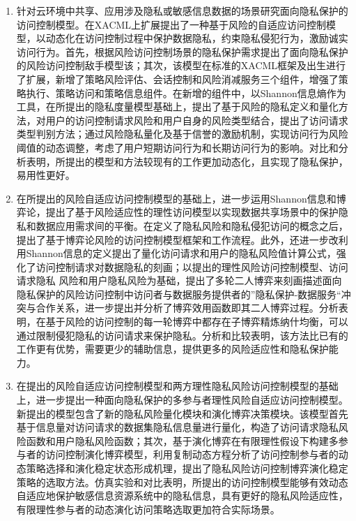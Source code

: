 \begin{enumerate}
	\item 针对云环境中共享、应用涉及隐私或敏感信息数据的场景研究面向隐私保护的访问控制模型。在XACML上扩展提出了一种基于风险的自适应访问控制模型，以动态化在访问控制过程中保护数据隐私，约束隐私侵犯行为，激励诚实访问行为。首先，根据风险访问控制场景的隐私保护需求提出了面向隐私保护的风险访问控制敌手模型该；其次，该模型在标准的XACML框架及出生进行了扩展，新增了策略风险评估、会话控制和风险消减服务三个组件，增强了策略执行、策略访问和策略信息组件。在新增的组件中，以Shannon信息熵作为工具，在所提出的隐私度量模型基础上，提出了基于风险的隐私定义和量化方法，对用户的访问控制请求风险和用户自身的风险类型结合，提出了访问请求类型判别方法；通过风险隐私量化及基于信誉的激励机制，实现访问行为风险阈值的动态调整，考虑了用户短期访问行为和长期访问行为的影响。对比和分析表明，所提出的模型和方法较现有的工作更加动态化，且实现了隐私保护，易用性更好。
	
	\item 在所提出的风险自适应访问控制模型的基础上，进一步运用Shannon信息和博弈论，提出了基于风险适应性的理性访问模型以实现数据共享场景中的保护隐私和数据应用需求间的平衡。在定义了隐私风险和隐私侵犯访问的概念之后，提出了基于博弈论风险的访问控制模型框架和工作流程。此外，还进一步改利用Shannon信息的定义提出了量化访问请求和用户的隐私风险值计算公式，强化了访问控制请求对数据隐私的刻画；以提出的理性风险访问控制模型、访问请求隐私 风险和用户隐私风险为基础，提出了多轮二人博弈来刻画描述面向隐私保护的风险访问控制中访问者与数据服务提供者的”隐私保护-数据服务“冲突与合作关系，进一步提出并分析了博弈效用函数即其二人博弈过程。分析表明，在基于风险的访问控制的每一轮博弈中都存在子博弈精炼纳什均衡，可以通过限制侵犯隐私的访问请求来保护隐私。分析和比较表明，该方法比已有的工作更有优势，需要更少的辅助信息，提供更多的风险适应性和隐私保护能力。
	
	\item 在提出的风险自适应访问控制模型和两方理性隐私风险访问控制模型的基础上，进一步提出一种面向隐私保护的多参与者理性风险自适应访问控制模型。新提出的模型包含了新的隐私风险量化模块和演化博弈决策模块。该模型首先基于信息量对访问请求的数据集隐私信息量进行量化，构造了访问请求隐私风险函数和用户隐私风险函数；其次，基于演化博弈在有限理性假设下构建多参与者的访问控制演化博弈模型，利用复制动态方程分析了访问控制参与者的动态策略选择和演化稳定状态形成机理，提出了隐私风险访问控制博弈演化稳定策略的选取方法。仿真实验和对比表明，所提出的访问控制模型能够有效动态自适应地保护敏感信息资源系统中的隐私信息，具有更好的隐私风险适应性，有限理性参与者的动态演化访问策略选取更加符合实际场景。
	
\end{enumerate}

